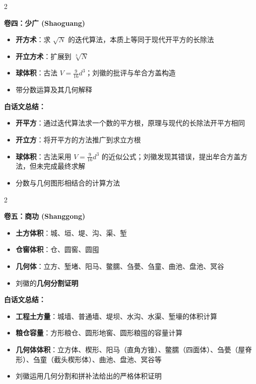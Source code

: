 \documentclass[11pt,a4paper]{article}
\begin{document}
\begin{paracol}{2}

\textbf{卷四：少广 (Shaoguang)}

\begin{itemize}[leftmargin=1.5em]
  \item \textbf{开方术}：求 $\sqrt{N}$ 的迭代算法，本质上等同于现代开平方的长除法
  \item \textbf{开立方术}：扩展到 $\sqrt[3]{N}$
  \item \textbf{球体积}：古法 $V = \frac{9}{16}d^3$；刘徽的批评与牟合方盖构造
  \item 带分数运算及其几何解释
\end{itemize}

\switchcolumn

\textbf{白话文总结：}

\begin{itemize}[leftmargin=1.5em]
  \item \textbf{开平方}：通过迭代算法求一个数的平方根，原理与现代的长除法开平方相同
  \item \textbf{开立方}：将开平方的方法推广到求立方根
  \item \textbf{球体积}：古法采用 $V = \frac{9}{16}d^3$ 的近似公式；刘徽发现其错误，提出牟合方盖方法，但未完成最终求解
  \item 分数与几何图形相结合的计算方法
\end{itemize}

\end{paracol}

\vspace{0.5cm}

\begin{paracol}{2}

\textbf{卷五：商功 (Shanggong)}

\begin{itemize}[leftmargin=1.5em]
  \item \textbf{土方体积}：城、垣、堤、沟、渠、堑
  \item \textbf{仓窖体积}：仓、圆窖、圆囤
  \item \textbf{几何体}：立方、堑堵、阳马、鳖臑、刍甍、刍童、曲池、盘池、冥谷
  \item 刘徽的\textbf{几何分割证明}
\end{itemize}

\switchcolumn

\textbf{白话文总结：}

\begin{itemize}[leftmargin=1.5em]
  \item \textbf{工程土方量}：城墙、普通墙、堤坝、水沟、水渠、堑壕的体积计算
  \item \textbf{粮仓容量}：方形粮仓、圆形地窖、圆形粮囤的容量计算
  \item \textbf{几何体体积}：立方体、楔形、阳马（直角方锥）、鳖臑（四面体）、刍甍（屋脊形）、刍童（截头楔形体）、曲池、盘池、冥谷等
  \item 刘徽运用几何分割和拼补法给出的严格体积证明
\end{itemize}

\end{paracol}
\end{document}
